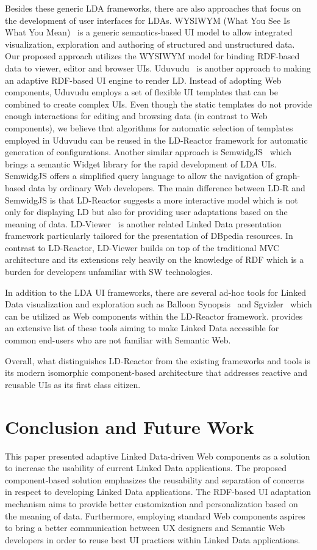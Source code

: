 \documentclass{llncs}
\begin{document}
Besides these generic LDA frameworks, there are also approaches that focus on the development of user interfaces for LDAs.
WYSIWYM (What You See Is What You Mean)~\cite{WYSIWYM2014} is a generic semantics-based UI model to allow integrated visualization, exploration and authoring of structured and unstructured data.
Our proposed approach utilizes the WYSIWYM model for binding RDF-based data to viewer, editor and browser UIs.
Uduvudu~\cite{Uduvudu2015} is another approach to making an adaptive RDF-based UI engine to render LD.
Instead of adopting Web components, Uduvudu employs a set of flexible UI templates that can be combined to create complex UIs.
Even though the static templates do not provide enough interactions for editing and browsing data (in contrast to Web components), we believe that algorithms for automatic selection of templates employed in Uduvudu can be reused in the LD-Reactor framework for automatic generation of configurations.
Another similar approach is SemwidgJS~\cite{StegemannZ14} which brings a semantic Widget library for the rapid development of LDA UIs.
SemwidgJS offers a simplified query language to allow the navigation of graph-based data by ordinary Web developers.
The main difference between LD-R and SemwidgJS is that LD-Reactor suggests a more interactive model which is not only for displaying LD but also for providing user adaptations based on the meaning of data.
LD-Viewer~\cite{Lukovnikov2014} is another related Linked Data presentation framework particularly tailored for the presentation of DBpedia resources.
In contrast to LD-Reactor, LD-Viewer  builds on top of the traditional MVC architecture and its extensions rely heavily on the knowledge of RDF which is a burden for developers unfamiliar with SW technologies.

In addition to the LDA UI frameworks, there are several ad-hoc tools for Linked Data visualization and exploration such as Balloon Synopsis~\cite{BalloonSchlegelWSGK14} and Sgvizler~\cite{Sgvizler} which can  be utilized as Web components within the LD-Reactor framework.
\cite{Abascal2015} provides an extensive list of these tools aiming to make Linked Data accessible for common end-users who are not familiar with Semantic Web.

Overall, what distinguishes LD-Reactor from the existing frameworks and tools is its modern isomorphic component-based architecture that addresses reactive and reusable UIs as its first class citizen.

\section{Conclusion and Future Work}
This paper presented adaptive Linked Data-driven Web components as a solution to increase the usability of current Linked Data applications.
The proposed component-based solution emphasizes the reusability and separation of concerns in respect to developing Linked Data applications.
The RDF-based UI adaptation mechanism aims to provide better customization and personalization based on the meaning of data.
Furthermore, employing standard Web components aspires to bring a better communication between UX designers and Semantic Web developers in order to reuse best UI practices within Linked Data applications.
\end{document}
